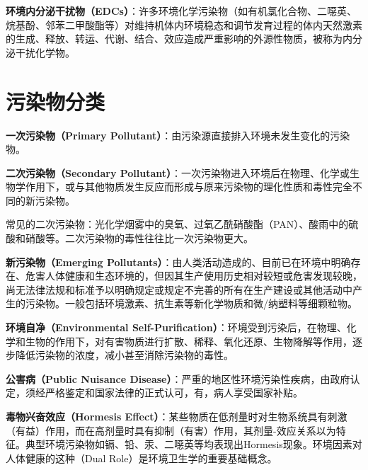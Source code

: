 \begin{defbox}
\textbf{环境内分泌干扰物（EDCs）}：许多环境化学污染物（如有机氯化合物、二噁英、烷基酚、邻苯二甲酸酯等）对维持机体内环境稳态和调节发育过程的体内天然激素的生成、释放、转运、代谢、结合、效应造成严重影响的外源性物质，被称为内分泌干扰化学物。
\end{defbox}

\section{污染物分类}

\begin{defbox}
\textbf{一次污染物（Primary Pollutant）}：由污染源直接排入环境未发生变化的污染物。
\end{defbox}

\begin{defbox}
\textbf{二次污染物（Secondary Pollutant）}：一次污染物进入环境后在物理、化学或生物学作用下，或与其他物质发生反应而形成与原来污染物的理化性质和毒性完全不同的新污染物。
\end{defbox}

\begin{keybox}
常见的二次污染物：光化学烟雾中的臭氧、过氧乙酰硝酸酯（PAN）、酸雨中的硫酸和硝酸等。二次污染物的毒性往往比一次污染物更大。
\end{keybox}

\begin{defbox}
\textbf{新污染物（Emerging Pollutants）}：由人类活动造成的、目前已在环境中明确存在、危害人体健康和生态环境的，但因其生产使用历史相对较短或危害发现较晚，尚无法律法规和标准予以明确规定或规定不完善的所有在生产建设或其他活动中产生的污染物。一般包括环境激素、抗生素等新化学物质和微/纳塑料等细颗粒物。

\textbf{环境自净（Environmental Self-Purification）}：环境受到污染后，在物理、化学和生物的作用下，对有害物质进行扩散、稀释、氧化还原、生物降解等作用，逐步降低污染物的浓度，减小甚至消除污染物的毒性。

\textbf{公害病（Public Nuisance Disease）}：严重的地区性环境污染性疾病，由政府认定，须经严格鉴定和国家法律的正式认可，有，病人享受国家补贴。

\textbf{毒物兴奋效应（Hormesis Effect）}：某些物质在低剂量时对生物系统具有刺激（有益）作用，而在高剂量时具有抑制（有害）作用，其剂量-效应关系以为特征。典型环境污染物如镉、铅、汞、二噁英等均表现出Hormesis现象。环境因素对人体健康的这种（Dual Role）是环境卫生学的重要基础概念。
\end{defbox}

